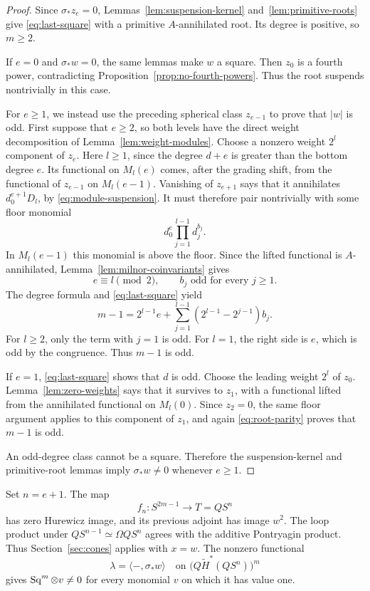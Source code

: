 \begin{proof}
Since \(\sigma_*z_e=0\), Lemmas~\ref{lem:suspension-kernel}
and~\ref{lem:primitive-roots} give \eqref{eq:last-square} with a
primitive \(A\)-annihilated root. Its degree is positive, so \(m\ge2\).

If \(e=0\) and \(\sigma_*w=0\), the same lemmas make \(w\) a
square. Then \(z_0\) is a fourth power, contradicting
Proposition~\ref{prop:no-fourth-powers}. Thus the root suspends
nontrivially in this case.

For \(e\ge1\), we instead use the preceding spherical class
\(z_{e-1}\) to prove that \(|w|\) is odd. First suppose that
\(e\ge2\), so both levels have the direct weight decomposition
of Lemma~\ref{lem:weight-modules}. Choose a nonzero weight \(2^l\)
component of \(z_e\). Here \(l\ge1\), since the degree \(d+e\)
is greater than the bottom degree \(e\). Its functional on
\(M_l(e)\) comes, after the grading shift, from the functional of
\(z_{e-1}\) on \(M_l(e-1)\). Vanishing of \(z_{e+1}\) says that
it annihilates \(d_0^{e+1}D_l\), by
\eqref{eq:module-suspension}. It must therefore pair nontrivially
with some floor monomial
\[
d_0^e\prod_{j=1}^{l-1}d_j^{b_j}.
\]
In \(M_l(e-1)\) this monomial is above the floor. Since the lifted
functional is \(A\)-annihilated, Lemma~\ref{lem:milnor-coinvariants}
gives
\[
e\equiv l\pmod2,\qquad b_j\text{ odd for every }j\ge1.
\]
The degree formula and \eqref{eq:last-square} yield
\begin{equation}\label{eq:root-parity}
m-1=2^{l-1}e+
\sum_{j=1}^{l-1}(2^{l-1}-2^{j-1})b_j.
\end{equation}
For \(l\ge2\), only the term with \(j=1\) is odd. For \(l=1\),
the right side is \(e\), which is odd by the congruence. Thus
\(m-1\) is odd.

If \(e=1\), \eqref{eq:last-square} shows that \(d\) is odd. Choose
the leading weight \(2^l\) of \(z_0\). Lemma~\ref{lem:zero-weights}
says that it survives to \(z_1\), with a functional lifted from the
annihilated functional on \(M_l(0)\). Since \(z_2=0\), the same
floor argument applies to this component of \(z_1\), and again
\eqref{eq:root-parity} proves that \(m-1\) is odd.

An odd-degree class cannot be a square. Therefore the suspension-kernel
and primitive-root lemmas imply \(\sigma_*w\ne0\) whenever \(e\ge1\).
\end{proof}

Set \(n=e+1\). The map
\[
f_n:S^{2m-1}\longrightarrow T=QS^n
\]
has zero Hurewicz image, and its previous adjoint has image \(w^2\).
The loop product under \(QS^{n-1}\simeq\Omega QS^n\) agrees with
the additive Pontryagin product. Thus Section~\ref{sec:cones} applies
with \(x=w\). The nonzero functional
\begin{equation}\label{eq:last-functional}
\lambda=\langle -,\sigma_*w\rangle
\quad\text{on }\bigl(Q\widetilde H^*(QS^n)\bigr)^m
\end{equation}
gives \(\operatorname{Sq}^m\otimes v\ne0\) for every monomial \(v\) on which
it has value one.

